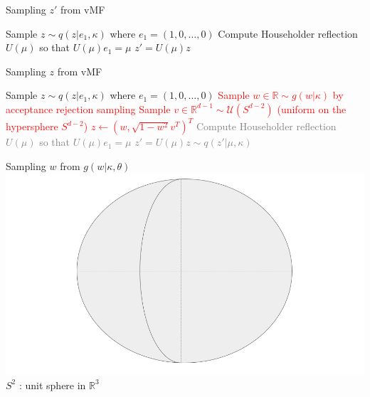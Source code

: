 \begin{frame}{Sampling $z'$ from vMF}
  \begin{algorithm}[H]
    \caption{Overview of the sampling method from $\mathcal{S}(\mu, \kappa)$}\label{alg:overviewsampling}
    \begin{algorithmic}[1]
      \STATE Sample $z \sim q(z| e_1, \kappa)$ where $e_1 = (1, 0, \dots, 0)$
      \STATE Compute Householder reflection $U(\mu)$ so that $U(\mu) e_1 = \mu$
      \RETURN $z' = U(\mu) z$
    \end{algorithmic}
    \end{algorithm}
  \end{frame}

  \begin{frame}{Sampling $z$ from vMF}
    \begin{algorithm}[H]
      \caption{Overview of the sampling method from $\mathcal{S}(\mu, \kappa)$}\label{alg:overviewsampling2}
      \begin{algorithmic}[1]
        \STATE Sample $z \sim q(z| e_1, \kappa)$ where $e_1 = (1, 0, \dots, 0)$
        \textcolor{red}{
          \STATE Sample $w \in \mathbb{R} \sim g(w |\kappa)$ by acceptance rejection sampling
          \STATE Sample $v \in \mathbb{R}^{d-1} \sim \mathcal{U}(S^{d-2})$ (uniform on the hypersphere $S^{d-2}$)
          \STATE $z \gets (w, \sqrt{1 - w^2}v^T)^T$
        }
        \textcolor{gray}{
        \STATE Compute Householder reflection $U(\mu)$ so that $U(\mu) e_1 = \mu$
        \RETURN $z' = U(\mu) z \sim q(z' | \mu, \kappa)$}
      \end{algorithmic}
      \end{algorithm}
    \end{frame}
  
\begin{frame}{Sampling $w$ from $g(w|\kappa, \theta)$}
  \centering
  \includegraphics[width=\textwidth]{figures/illustration_sampling_1.png}
  $S^{2}$ : unit sphere in $\mathbb{R}^{3}$
\end{frame}

